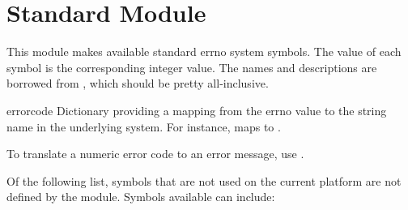 \section{Standard Module }




This module makes available standard errno system symbols.
The value of each symbol is the corresponding integer value.
The names and descriptions are borrowed from ,
which should be pretty all-inclusive.

\begin{datadesc}{errorcode}
  Dictionary providing a mapping from the errno value to the string
  name in the underlying system.  For instance,
   maps to .
\end{datadesc}

To translate a numeric error code to an error message, use
.

Of the following list, symbols that are not used on the current
platform are not defined by the module.  Symbols available can
include:

